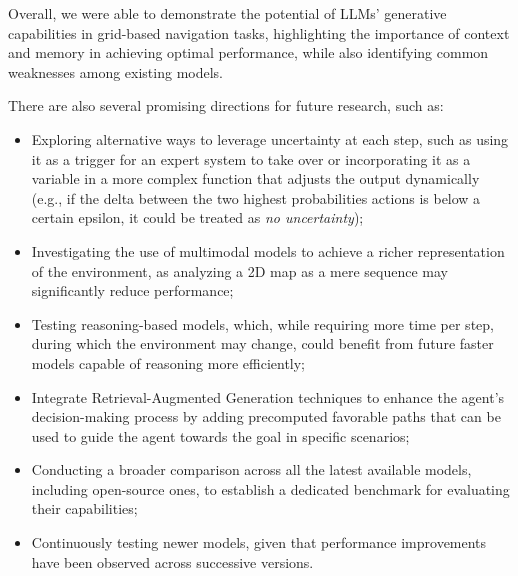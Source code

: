 Overall, we were able to demonstrate the potential of LLMs' generative
capabilities in grid-based navigation tasks, highlighting the importance of context
and memory in achieving optimal performance, while also identifying common
weaknesses among existing models.

There are also several promising directions for future research, such as:

\begin{itemize}
  \item Exploring alternative ways to leverage uncertainty at each step, such as
    using it as a trigger for an expert system to take over or incorporating it
    as a variable in a more complex function that adjusts the output dynamically
    (e.g., if the delta between the two highest probabilities actions is below a
    certain epsilon, it could be treated as \emph{no uncertainty});

  \item Investigating the use of multimodal models to achieve a richer representation
    of the environment, as analyzing a 2D map as a mere sequence may
    significantly reduce performance;

  \item Testing reasoning-based models, which, while requiring more time per step,
    during which the environment may change, could benefit from future faster models
    capable of reasoning more efficiently;

  \item Integrate Retrieval-Augmented Generation techniques to enhance the agent's
    decision-making process by adding precomputed favorable paths that can be used
    to guide the agent towards the goal in specific scenarios;

  \item Conducting a broader comparison across all the latest available models,
    including open-source ones, to establish a dedicated benchmark for evaluating
    their capabilities;

  \item Continuously testing newer models, given that performance improvements
    have been observed across successive versions.
\end{itemize}